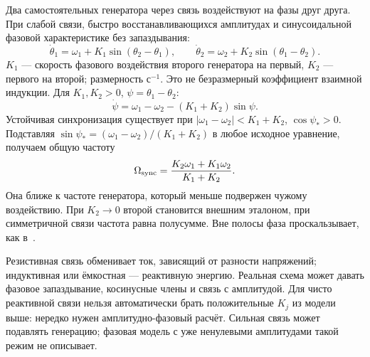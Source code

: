 Два самостоятельных генератора через связь воздействуют на фазы друг друга. При слабой связи, быстро восстанавливающихся амплитудах и синусоидальной фазовой характеристике без запаздывания:
\begin{equation}\label{eq:mutuallocking}
 \dot\theta_1=\omega_1+K_1\sin(\theta_2-\theta_1),\qquad
 \dot\theta_2=\omega_2+K_2\sin(\theta_1-\theta_2).
\end{equation}
$K_1$ --- скорость фазового воздействия второго генератора на первый, $K_2$ --- первого на второй; размерность с$^{-1}$. Это не безразмерный коэффициент взаимной индукции. Для $K_1,K_2>0$, $\psi=\theta_1-\theta_2$:
\begin{equation}
 \dot\psi=\omega_1-\omega_2-(K_1+K_2)\sin\psi.
\end{equation}
Устойчивая синхронизация существует при $|\omega_1-\omega_2|<K_1+K_2$, $\cos\psi_*>0$. Подставляя $\sin\psi_*=(\omega_1-\omega_2)/(K_1+K_2)$ в любое исходное уравнение, получаем общую частоту
\begin{equation}
 \Omega_{\rm sync}=\frac{K_2\omega_1+K_1\omega_2}{K_1+K_2}.
\end{equation}
Она ближе к частоте генератора, который меньше подвержен чужому воздействию. При $K_2\to0$ второй становится внешним эталоном, при симметричной связи частота равна полусумме. Вне полосы фаза проскальзывает, как в~.

Резистивная связь обменивает ток, зависящий от разности напряжений; индуктивная или ёмкостная --- реактивную энергию. Реальная схема может давать фазовое запаздывание, косинусные члены и связь с амплитудой. Для чисто реактивной связи нельзя автоматически брать положительные $K_j$ из модели выше: нередко нужен амплитудно-фазовый расчёт. Сильная связь может подавлять генерацию; фазовая модель с уже ненулевыми амплитудами такой режим не описывает.
